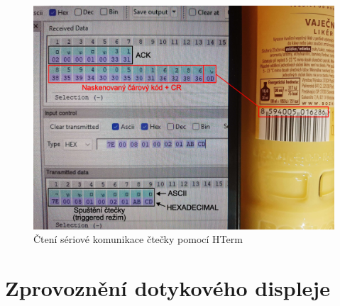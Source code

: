 \begin{figure}[h]
    \begin{center}
        \includegraphics[scale=0.33]{obrazky/hterm_ctecka_oriznutí_(Velký)_3_4MB.png}
    \end{center}
    \caption{Čtení sériové komunikace čtečky pomocí HTerm}
    \label{Zprovoznění čtečky}
\end{figure}



\section{Zprovoznění dotykového displeje}

